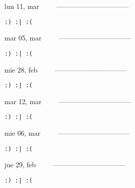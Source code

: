 \documentclass[letterpaper,10pt]{article}
\begin{document}
\begin{multicols}{3}
{lun 11, mar\ \ \ \ \ --------------------------------}
\begin{flushright}\begin{small}\texttt{:) :| :(}\end{small}\end{flushright}
\vfill
{mar 05, mar\ \ \ \ \ --------------------------------}
\begin{flushright}\begin{small}\texttt{:) :| :(}\end{small}\end{flushright}\par
\vfill
{mie 28, feb\ \ \ \ \ --------------------------------}
\begin{flushright}\begin{small}\texttt{:) :| :(}\end{small}\end{flushright}\par
\vfill
\end{multicols}
\vspace{1.05cm}

\begin{multicols}{3}
{mar 12, mar\ \ \ \ \ --------------------------------}
\begin{flushright}\begin{small}\texttt{:) :| :(}\end{small}\end{flushright}
\vfill
{mie 06, mar\ \ \ \ \ --------------------------------}
\begin{flushright}\begin{small}\texttt{:) :| :(}\end{small}\end{flushright}\par
\vfill
{jue 29, feb\ \ \ \ \ --------------------------------}
\begin{flushright}\begin{small}\texttt{:) :| :(}\end{small}\end{flushright}\par
\vfill
\end{multicols}
\vspace{1.05cm}
\end{document}
